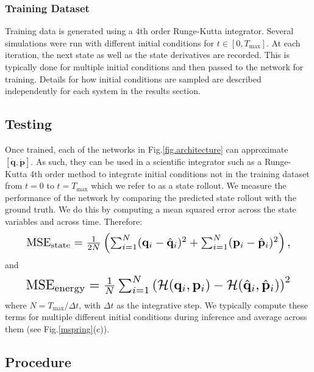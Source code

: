 \documentclass{article}
\begin{document}
\subsubsection{Training Dataset}

Training data is generated using a 4th order Runge-Kutta integrator. Several simulations were run with different initial conditions for $t\in [0,T_{\max}]$. At each iteration, the next state as well as the state derivatives are recorded. This is typically done for multiple initial conditions and then passed to the network for training. Details for how initial conditions are sampled are described independently for each system in the results section.

\subsection{Testing}
Once trained, each of the networks in Fig.\ref{fig.architecture} can approximate $[\dot{\mathbf{q}},\dot{\mathbf{p}}]$. As such, they can be used in a scientific integrator such as a Runge-Kutta 4th order method to integrate initial conditions not in the training dataset from $t=0$ to $t=T_{\max}$ which we refer to as a state rollout. We measure the performance of the network by comparing the predicted state rollout with the ground truth. We do this by computing a mean squared error across the state variables and across time. Therefore:
\begin{equation}
\resizebox{0.9\linewidth}{!}{$%
\mathrm{MSE}_{\mathrm{state}} = \frac{1}{2N} \left(\sum_{i=1}^N (\mathbf{q}_i-\hat{\mathbf{q}}_i)^2 + \sum_{i=1}^N (\mathbf{p}_i - \hat{\mathbf{p}}_i)^2\right),$}%
\end{equation}
and
\begin{equation}
\resizebox{0.9\linewidth}{!}{$%
\mathrm{MSE}_{\mathrm{energy}} = \frac{1}{N} \sum_{i=1}^N \left(\mathcal{H}(\mathbf{q}_i,\mathbf{p}_i)-\mathcal{H}(\hat{\mathbf{q}}_i,\hat{\mathbf{p}}_i)\right)^2$}%
\end{equation}
where $N = T_{\max}/\Delta t $, with $\Delta t$ as the integrative step. We typically compute these terms for multiple different initial conditions during inference and average across them (see Fig.\ref{mspring}(c)).

\subsection{Procedure}
\end{document}

